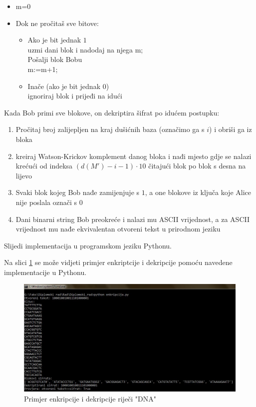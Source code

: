 \documentclass[a4paper,oneside,12pt]{memoir} %
\begin{document}
\begin{spacing}{1.5}
\begin{enumerate}
	\begin{itemize}
		\item m=0
		\item Dok ne pročitaš sve bitove:
		\begin{itemize}		
			\item Ako je bit jednak $1$\\
		  uzmi dani blok i nadodaj na njega m; \\
			Pošalji blok Bobu\\		  
		   m:=m+1;
			\item Inače (ako je bit jednak $0$)\\
		ignoriraj blok i prijeđi na idući
		\end{itemize}	
	\end{itemize}
\end{enumerate}
Kada Bob primi sve blokove, on dekriptira šifrat po idućem postupku:
\begin{enumerate}
	\item Pročitaj broj zalijepljen na kraj dušićnih baza (označimo ga s $i$) i obriši ga iz bloka
	\item kreiraj Watson-Krickov komplement danog bloka i nađi mjesto gdje se nalazi krećući od indeksa $(d(M')-i-1)\cdot 10$ čitajući blok po blok s desna na lijevo
	\item Svaki blok kojeg Bob nađe zamijenjuje s $1$, a one blokove iz ključa koje Alice nije poslala označi s $0$
	\item Dani binarni string Bob preokreće i nalazi mu ASCII vrijednost, a za ASCII vrijednost mu nađe ekvivalentan otvoreni tekst u prirodnom jeziku 
\end{enumerate}
Slijedi implementacija u programskom jeziku Pythonu.

Na slici \ref{fig:prim} se može vidjeti primjer enkriptcije i dekripcije pomoću navedene implementacije u Pythonu.
\begin{figure}[h]
\centering \includegraphics[scale=0.5]{primjer.jpg}
\caption{Primjer enkripcije i dekripcije riječi "DNA"}
\label{fig:prim}
\end{figure}


\end{spacing}
\end{document}
